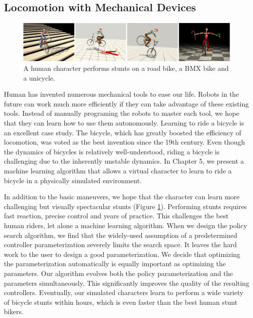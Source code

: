 \subsection{Locomotion with Mechanical Devices}

\begin{figure}[!h]
  \centering
    \includegraphics[width=\textwidth]{figures/teaserBicycle.eps}
  \caption{A human character performs stunts on a road bike, a BMX bike and a unicycle.}
  \label{fig:teaser3}
\end{figure}

Human has invented numerous mechanical tools to ease our life. Robots in the future can work much more efficiently if they can take advantage of these existing tools. Instead of manually programing the robots to master each tool, we hope that they can learn how to use them autonomously. Learning to ride a bicycle is an excellent case study. The bicycle, which has greatly boosted the efficiency of locomotion, was voted as the best invention since the 19th century. Even though the dynamics of bicycles is relatively well-understood, riding a bicycle is challenging due to the inherently unstable dynamics. In Chapter 5, we present a machine learning algorithm that allows a virtual character to learn to ride a bicycle in a physically simulated environment. 

In addition to the basic maneuvers, we hope that the character can learn more challenging but visually spectacular stunts (Figure \ref{fig:teaser3}). Performing stunts requires fast reaction, precise control and years of practice. This challenges the best human riders, let alone a machine learning algorithm. When we design the policy search algorithm, we find that the widely-used assumption of a predetermined controller parameterization severely limits the search space. It leaves the hard work to the user to design a good parameterization. We decide that optimizing the parameterization automatically is equally important as optimizing the parameters. Our algorithm evolves both the policy parameterization and the parameters simultaneously. This significantly improves the quality of the resulting controllers. Eventually, our simulated characters learn to perform a wide variety of bicycle stunts within hours, which is even faster than the best human stunt bikers.

